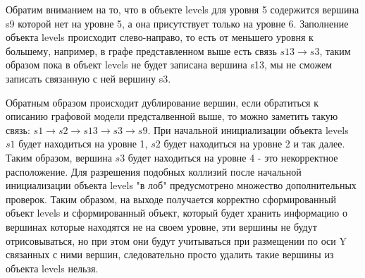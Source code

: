 Обратим вниманием на то, что в объекте levels для уровня 5 содержится вершина s9 которой нет на уровне 5, а она присутствует только на уровне 6. Заполнение объекта levels происходит слево-направо, то есть от меньшего уровня к большему, например, в графе представленном выше есть связь $s13 \rightarrow s3$, таким образом пока в объект levels не будет записана вершина s13, мы не сможем записать связанную с ней вершину s3.

Обратным образом происходит дублирование вершин, если обратиться к описанию графовой модели предсталвенной выше, то можно заметить такую связь: $s1 \rightarrow s2 \rightarrow s13 \rightarrow s3 \rightarrow s9$. При начальной инициализации объекта levels $s1$ будет находиться на уровне 1, $s2$ будет находиться на уровне 2 и так далее. Таким образом, вершина $s3$ будет находиться на уровне 4 - это некорректное расположение. Для разрешения подобных коллизий после начальной инициализации объекта levels "в лоб" предусмотрено множество дополнительных проверок. Таким образом, на выходе получается корректно сформированный объект levels и сформированный объект, который будет хранить информацию о вершинах которые находятся не на своем уровне, эти вершины не будут отрисовываться, но при этом они будут учитываться при размещении по оси Y связанных с ними вершин, следовательно просто удалить такие вершины из объекта levels нельзя.

